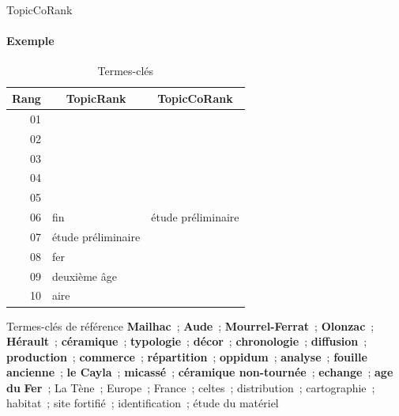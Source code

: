 \begin{frame}{TopicCoRank}\framesubtitle{Exemple}
  \begin{table}
      \centering
      \begin{tabular}{r|l|l}
        \toprule
        \textbf{Rang} & \multicolumn{1}{c|}{\textbf{TopicRank}} & \multicolumn{1}{c}{\textbf{TopicCoRank}} \\
        \hline
        01 & \cellcolor{termithgreen!30}{décors} & \cellcolor{termithgreen!30}{céramique} \\
        02 & \cellcolor{termithgreen!30}{céramique} & \cellcolor{termithgreen!30}{décors} \\
        03 & \cellcolor{termithgreen!30}{chronologie} & \cellcolor{termithgreen!30}{typologie} \\
        04 & \cellcolor{termithgreen!30}{typologie} & \cellcolor{termithgreen!30}{chronologie} \\
        05 & \cellcolor{termithgreen!30}{production} & \cellcolor{termithgreen!30}{production} \\
        06 & fin & étude préliminaire \\
        07 & étude préliminaire & \cellcolor{termithgreen!30}{diffusion} \\
        08 & fer & \cellcolor{termithgreen!30}{analyse\hspace{4em}*} \\
        09 & deuxième âge & \cellcolor{termithgreen!30}{France\hspace{3.725em}**} \\
        10 & aire & \cellcolor{termithgreen!30}{répartition} \\
        \bottomrule
      \end{tabular}

      \caption{Termes-clés}
    \end{table}

    \begin{exampleblock}{\small Termes-clés de référence}\justifying\small
      \textbf{Mailhac}~; \textbf{Aude}~; \textbf{Mourrel-Ferrat}~;
      \textbf{Olonzac}~; \textbf{Hérault}~; \textbf{céramique}~;
      \textbf{typologie}~; \textbf{décor}~; \textbf{chronologie}~;
      \textbf{diffusion}~; \textbf{production}~; \textbf{commerce}~;
      \textbf{répartition}~; \textbf{oppidum}~; \textbf{analyse}~;
      \textbf{fouille ancienne}~; \textbf{le Cayla}~;
      \textbf{micassé}~; \textbf{céramique non-tournée}~;
      \textbf{echange}~; \textbf{age du} \textbf{Fer}~; La Tène~;
      Europe~; France~; celtes~; distribution~; cartographie~; habitat~; site
      fortifié~; identification~; étude du matériel
    \end{exampleblock}
\end{frame}

